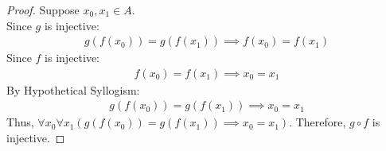 \documentclass[article,12pt]{article}
\newcommand{\comp}{\circ}
\begin{document}
\begin{proof}
Suppose $x_0, x_1 \in A$. \\

Since $g$ is injective: 
\begin{align*}
    g(f(x_0)) = g(f(x_1)) \implies f(x_0) = f(x_1) 
\end{align*}
Since $f$ is injective:
\begin{align*}
    f(x_0) = f(x_1) \implies x_0 = x_1
\end{align*}
By Hypothetical Syllogism: 
\begin{align*}
    g(f(x_0)) = g(f(x_1)) \implies x_0 = x_1
\end{align*}
Thus, $\forall x_0 \forall x_1 (g(f(x_0)) = g(f(x_1)) \implies x_0 = x_1)$. Therefore, $g \comp f$ is injective.    
\end{proof}
\end{document}
